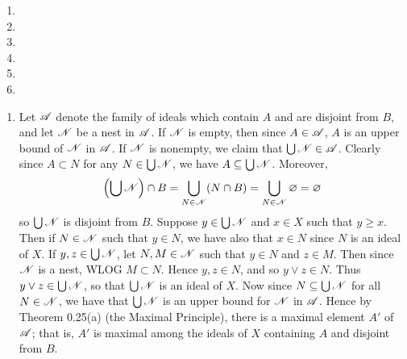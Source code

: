 \begin{prob}
\begin{enumerate}
\item 

\item 

\item 

\item 

\item 

\item 
\end{enumerate}
\end{prob}

\begin{prob}
\begin{enumerate}
\item Let $\mathscr{A}$ denote the family of ideals which contain $A$ and are disjoint from $B$, and let $\mathscr{N}$ be a nest in $\mathscr{A}$. If $\mathscr{N}$ is empty, then since $A \in \mathscr{A}$, $A$ is an upper bound of $\mathscr{N}$ in $\mathscr{A}$. If $\mathscr{N}$ is nonempty, we claim that $\bigcup\mathscr{N} \in \mathscr{A}$. Clearly since $A \subset N$ for any $N \in \bigcup\mathscr{N}$, we have $A \subseteq \bigcup\mathscr{N}$. Moreover, \[\left(\bigcup\mathscr{N}\right)\cap B = \bigcup_{N \in \mathscr{N}}(N\cap B) = \bigcup_{N \in \mathscr{N}}\varnothing = \varnothing\] so $\bigcup\mathscr{N}$ is disjoint from $B$. Suppose $y \in \bigcup\mathscr{N}$ and $x \in X$ such that $y \geq x$. Then if $N \in \mathscr{N}$ such that $y \in N$, we have also that $x \in N$ since $N$ is an ideal of $X$. If $y, z \in \bigcup\mathscr{N}$, let $N, M \in \mathscr{N}$ such that $y \in N$ and $z \in M$. Then since $\mathscr{N}$ is a nest, WLOG $M \subset N$. Hence $y, z \in N$, and so $y\vee z \in N$. Thus $y\vee z \in \bigcup\mathscr{N}$, so that $\bigcup\mathscr{N}$ is an ideal of $X$. Now since $N \subseteq \bigcup\mathscr{N}$ for all $N \in \mathscr{N}$, we have that $\bigcup\mathscr{N}$ is an upper bound for $\mathscr{N}$ in $\mathscr{A}$. Hence by Theorem 0.25(a) (the Maximal Principle), there is a maximal element $A'$ of $\mathscr{A}$; that is, $A'$ is maximal among the ideals of $X$ containing $A$ and disjoint from $B$.


\end{enumerate}
\end{prob}
